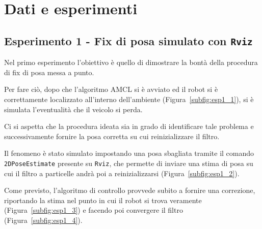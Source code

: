 \chapter{Dati e esperimenti}
\label{chapter3}
\section{Esperimento 1 - Fix di posa simulato con \texttt{Rviz}}
\label{section3.1}
Nel primo esperimento l'obiettivo è quello di dimostrare la bontà della procedura di fix di posa messa a punto.


Per fare ciò, dopo che l'algoritmo AMCL si è avviato ed il robot si è correttamente localizzato all'interno dell'ambiente (Figura~\ref{subfig:esp1_1}), si è simulata l'eventualità che il veicolo si perda.

Ci si aspetta che la procedura ideata sia in grado di identificare tale problema e successivamente fornire la posa corretta su cui reinizializzare il filtro. 

Il fenomeno è stato simulato impostando una posa sbagliata tramite il comando \texttt{2DPoseEstimate} presente su \texttt{Rviz}, che permette di inviare una stima di posa su cui il filtro a particelle andrà poi a reinizializzarsi (Figura~\ref{subfig:esp1_2}). 

Come previsto, l'algoritmo di controllo provvede subito a fornire una correzione, riportando la stima nel punto in cui il robot si trova veramente (Figura~\ref{subfig:esp1_3}) e facendo poi convergere il filtro (Figura~\ref{subfig:esp1_4}). 
\bigskip

% 
% 
 
